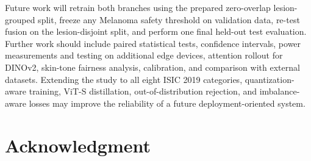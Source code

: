 \documentclass[3p,times,procedia]{elsarticle}
\begin{document}
Future work will retrain both branches using the prepared zero-overlap lesion-grouped split, freeze any Melanoma safety threshold on validation data, re-test fusion on the lesion-disjoint split, and perform one final held-out test evaluation. Further work should include paired statistical tests, confidence intervals, power measurements and testing on additional edge devices, attention rollout for DINOv2, skin-tone fairness analysis, calibration, and comparison with external datasets. Extending the study to all eight ISIC 2019 categories, quantization-aware training, ViT-S distillation, out-of-distribution rejection, and imbalance-aware losses may improve the reliability of a future deployment-oriented system.

\section*{Acknowledgment}
\end{document}
